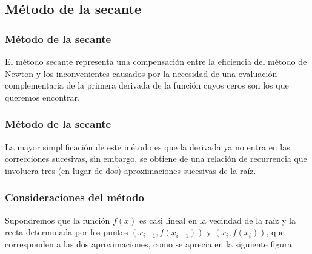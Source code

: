 \subsection{Método de la secante}
\begin{frame}
\frametitle{Método de la secante}
El método secante representa una compensación entre la eficiencia del método de Newton y los inconvenientes causados por la necesidad de una evaluación complementaria de la primera derivada de la función cuyos ceros son los que queremos encontrar.
\end{frame}
\begin{frame}
\frametitle{Método de la secante}
La mayor simplificación de este método es que la derivada ya no entra en las correcciones sucesivas, sin embargo, se obtiene de una relación de recurrencia que involucra tres (en lugar de dos) aproximaciones sucesivas de la raíz.
\end{frame}
\begin{frame}
\frametitle{Consideraciones del método}
Supondremos que la función $f(x)$ es casi lineal en la vecindad de la raíz y la recta determinada por los puntos $(x_{i-1}, f(x_{i-1}))$ y $(x_{i}, f(x_{i}))$, que corresponden a las dos aproximaciones, como se aprecia en la siguiente figura.
\end{frame}

